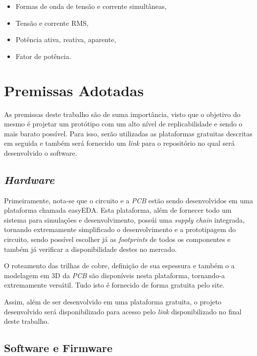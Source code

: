 \begin{itemize}
    \item Formas de onda de tensão e corrente simultâneas,
    \item Tensão e corrente RMS,
    \item Potência ativa, reativa, aparente,
    \item Fator de potência.
\end{itemize}

\section{Premissas Adotadas}\label{premissas1}

As premissas deste trabalho são de suma importância, visto que o objetivo do mesmo é projetar um protótipo com um alto nível de replicabilidade e sendo o mais barato possível. Para isso, serão utilizadas as plataformas gratuitas descritas em seguida e também será fornecido um \textit{link} para o repositório no qual será desenvolvido o software.

\subsection{\textit{Hardware}}\label{proto}

Primeiramente, nota-se que o circuito e a \textit{\gls{PCB}} estão sendo desenvolvidos em uma plataforma chamada easyEDA. Esta plataforma, além de fornecer todo um sistema para simulações e desenvolvimento, possúi uma \textit{supply chain} integrada, tornando extremamente simplificado o desenvolvimento e a prototipagem do circuito, sendo possível escolher já as \textit{footprints} de todos os componentes e também já verificar a disponibilidade destes no mercado.

O roteamento das trilhas de cobre, definição de sua espessura e também o a modelagem em 3D da \textit{\gls{PCB}} são disponíveis nesta plataforma, tornando-a extremamente versátil. Tudo isto é fornecido de forma gratuita pelo site.

Assim, além de ser desenvolvido em uma plataforma gratuita, o projeto desenvolvido será disponibilizado para acesso pelo \textit{link} disponibilizado no final deste trabalho.

\subsection{Software e Firmware}\label{softw}

